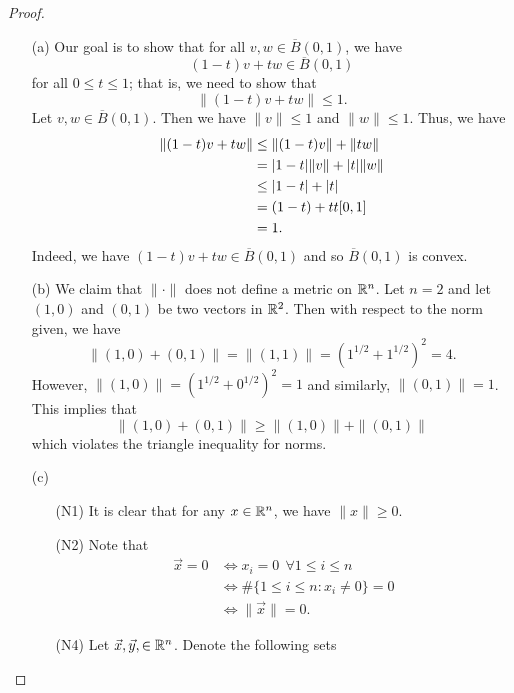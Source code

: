\documentclass[a4paper]{article}
\begin{document}
\begin{proof}
\begin{enumerate}
    \item[(a)] Our goal is to show that for all \( v,w \in \overline{B}(0,1) \), we have 
        \[  (1-t)v + tw \in \overline{B}(0,1)  \]
        for all \( 0 \leq t \leq 1  \); that is, we need to show that 
        \[  \|(1-t)v + tw\| \leq 1.  \]
        Let \( v,w \in \overline{B}(0,1) \). Then we have \( \|v\| \leq 1  \) and \( \|w \| \leq 1  \). Thus, we have 
        \begin{align*}
            \|(1-t) v + t w \| &\leq \|(1-t)v\| + \|tw\|  \\
                               &= | 1 - t  |  \| v \| + | t  |  \|w\| \\
                               &\leq | 1 - t  |  + | t |  \\
                               &= (1- t) + t \text{\( t [0,1] \)} \\
                               &= 1.
        \end{align*}
        Indeed, we have \( (1-t)v + tw \in \overline{B}(0,1) \) and so \( \overline{B}(0,1) \) is convex.
    \item[(b)] We claim that \( \|\cdot\| \) does not define a metric on \( \mathbb{R}^{n} \). Let \( n = 2  \) and let \( (1,0) \) and \(  (0,1) \) be two vectors in \( \mathbb{R}^{2} \). Then with respect to the norm given, we have 
        \[  \|(1,0) + (0,1) \| = \|(1,1)\| = (1^{1/2} + 1^{1/2})^{2}  = 4. \]
        However, \( \|(1,0)\| = (1^{1/2} + 0^{1/2})^{2} = 1 \) and similarly, \( \| (0,1)\| = 1  \). This implies that 
        \[  \|(1,0) + (0,1)\| \geq \|(1,0)\| + \|(0,1)\| \]
        which violates the triangle inequality for norms.
    \item[(c)]
        \begin{enumerate}
            \item[(N1)] It is clear that for any \( x \in \mathbb{R}^{n} \), we have \( \|x\| \geq 0  \).
            \item[(N2)] Note that 
                \begin{align*}
                    \vec{ x } = 0 &\iff {x}_{i} = 0 \ \ \forall 1 \leq i \leq n  \\  
                    &\iff \# \{  1 \leq i \leq n : {x}_{i} \neq 0  \}  = 0  \\
                    &\iff \|\vec{ x } \| = 0.
                \end{align*}
            \item[(N4)] Let \( \vec{ x } , \vec{ y }, \in \mathbb{R}^{n} \). Denote the following sets

\end{enumerate}
\end{enumerate}
\end{proof}
\end{document}
